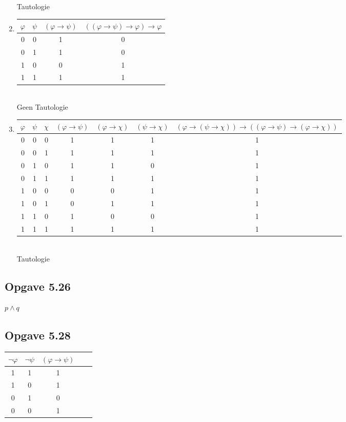 \documentclass[11pt]{article}
\begin{document}
\begin{enumerate}[label=(\arabic*)]
  Tautologie

  \item
  \begin{tabular}{cc|c|c}
  $\varphi$ & $\psi$ & $(\varphi \rightarrow \psi)$
    & $((\varphi \rightarrow \psi) \rightarrow \varphi) \rightarrow \varphi$ \\
  \hline
  0 & 0 & 1 & 0\\
  0 & 1 & 1 & 0\\
  1 & 0 & 0 & 1\\
  1 & 1 & 1 & 1\\
  \end{tabular} \\

  Geen Tautologie

  \item
  \begin{tabular}{ccc|ccc|c}
  $\varphi$ & $\psi$ & $\chi$ &
    $(\varphi \rightarrow \psi)$ &
    $(\varphi \rightarrow \chi)$ &
    $(\psi \rightarrow \chi)$ &
    $(\varphi \rightarrow (\psi \rightarrow \chi))
      \rightarrow
      ((\varphi \rightarrow \psi) \rightarrow (\varphi \rightarrow \chi))$ \\
  \hline
  0 & 0 & 0 & 1 & 1 & 1 & 1\\
  0 & 0 & 1 & 1 & 1 & 1 & 1\\
  0 & 1 & 0 & 1 & 1 & 0 & 1\\
  0 & 1 & 1 & 1 & 1 & 1 & 1\\
  1 & 0 & 0 & 0 & 0 & 1 & 1\\
  1 & 0 & 1 & 0 & 1 & 1 & 1\\
  1 & 1 & 0 & 1 & 0 & 0 & 1\\
  1 & 1 & 1 & 1 & 1 & 1 & 1\\
  \end{tabular} \\

  Tautologie

\end{enumerate}


\subsection*{Opgave 5.26}

$p\wedge q$

\subsection*{Opgave 5.28}

\begin{tabular}{cc|cc|c}
$\neg \varphi$ & $\neg \psi$ &
  $(\varphi \rightarrow \psi)$ \\
\hline
1 & 1 & 1 \\
1 & 0 & 1 \\
0 & 1 & 0 \\
0 & 0 & 1 \\
\end{tabular}
\\
\end{document}
